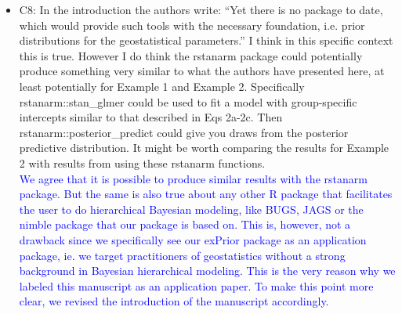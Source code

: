 \documentclass{article}
\begin{document}
\begin{itemize}
    \item C8: In the introduction the authors write: “Yet there is no package to date, which would provide such tools with the necessary foundation, i.e. prior distributions for the geostatistical parameters.” I think in this specific context this is true. However I do think the rstanarm package could potentially produce something very similar to what the authors have presented here, at least potentially for Example 1 and Example 2. Specifically rstanarm::stan\_glmer could be used to fit a model with group-specific intercepts similar to that described in Eqs 2a-2c. Then rstanarm::posterior\_predict could give you draws from the posterior predictive distribution. It might be worth comparing the results for Example 2 with results from using these rstanarm functions.\\
    \textcolor{blue}{We agree that it is possible to produce similar results with the rstanarm package. But the same is also true about any other R package that facilitates the user to do hierarchical Bayesian modeling, like BUGS, JAGS or the nimble package that our package is based on. This is, however, not a drawback since we specifically see our exPrior package as an application package, ie. we target practitioners of geostatistics without a strong background in Bayesian hierarchical modeling. This is the very reason why we labeled this manuscript as an application paper.}
    \textcolor{blue}{To make this point more clear, we revised the introduction of the manuscript accordingly.}
    
    

\end{itemize}
\end{document}
